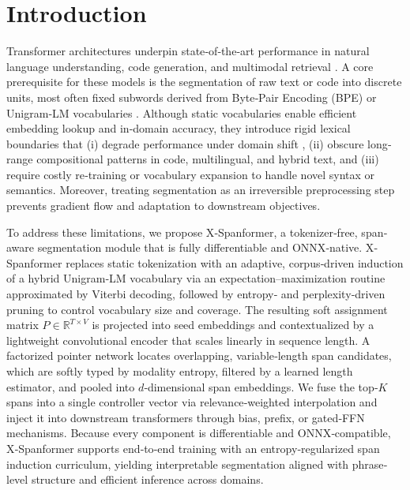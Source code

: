 \section{Introduction}

Transformer architectures underpin state‐of‐the‐art performance in natural language understanding, code generation, and multimodal retrieval \cite{vaswani2017attention,devlin2019bert,radford2019gpt2,raffel2020t5}.  A core prerequisite for these models is the segmentation of raw text or code into discrete units, most often fixed subwords derived from Byte‐Pair Encoding (BPE) \cite{sennrich2016bpe} or Unigram‐LM vocabularies \cite{kudo2018sentencepiece}.  Although static vocabularies enable efficient embedding lookup and in‐domain accuracy, they introduce rigid lexical boundaries that (i) degrade performance under domain shift \cite{galle2021respite}, (ii) obscure long‐range compositional patterns in code, multilingual, and hybrid text, and (iii) require costly re‐training or vocabulary expansion to handle novel syntax or semantics.  Moreover, treating segmentation as an irreversible preprocessing step prevents gradient flow and adaptation to downstream objectives.

To address these limitations, we propose X‐Spanformer, a tokenizer‐free, span‐aware segmentation module that is fully differentiable and ONNX‐native.  X‐Spanformer replaces static tokenization with an adaptive, corpus‐driven induction of a hybrid Unigram‐LM vocabulary via an expectation–maximization routine approximated by Viterbi decoding, followed by entropy‐ and perplexity‐driven pruning to control vocabulary size and coverage.  The resulting soft assignment matrix \(P\in\mathbb{R}^{T\times V}\) is projected into seed embeddings and contextualized by a lightweight convolutional encoder that scales linearly in sequence length.  A factorized pointer network locates overlapping, variable‐length span candidates, which are softly typed by modality entropy, filtered by a learned length estimator, and pooled into \(d\)‐dimensional span embeddings.  We fuse the top‐\(K\) spans into a single controller vector via relevance‐weighted interpolation and inject it into downstream transformers through bias, prefix, or gated‐FFN mechanisms.  Because every component is differentiable and ONNX‐compatible, X‐Spanformer supports end‐to‐end training with an entropy‐regularized span induction curriculum, yielding interpretable segmentation aligned with phrase‐level structure and efficient inference across domains.

